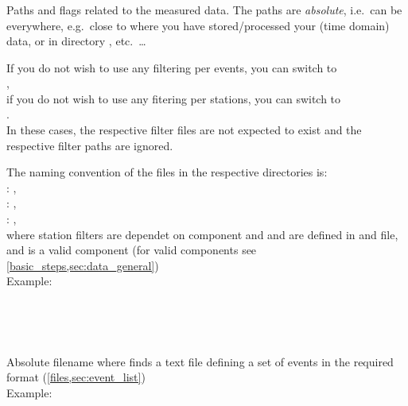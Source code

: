 \subsubsection{} 
\label{files,sec:main_parfile,itm:path_mdata_filters}
Paths and flags related to the measured data. The paths are \emph{absolute}, i.e.\ can be everywhere, 
e.g.\ close to where you 
have stored/processed your (time domain) data, or in directory , etc.\ \dots

If you do not wish to use any filtering per events, you can switch to\\
,\\
if you do not wish to use any fitering per stations, you can switch to\\
.\\
In these cases, the respective filter files are not expected to exist and the respective filter paths are
ignored.

The naming convention of the files in the respective directories is:\\
: ,\\
: ,\\
: , \\
where station filters are dependet on component and  and  are 
defined in  and  file, and  
is a valid component (for valid components see \ref{basic_steps,sec:data_general})\\
Example: \\
\\
\\
\\

\subsubsection{} \label{files,sec:main_parfile,itm:file_event_list}
Absolute filename where \ASKI finds a text file defining a set of events in the required format 
(\ref{files,sec:event_list})\\
Example: 
